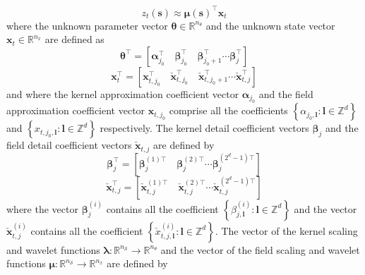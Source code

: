 \documentclass[11pt,draftcls,onecolumn,peerreview]{IEEEtran}
\begin{document}
\begin{equation}
 z_t\left(\mathbf{s}\right)\approx\boldsymbol\mu\left(\mathbf{s}\right)^\top\mathbf{x}_t
\label{eq:FieldFiniteExpansion}
\end{equation}
where the unknown parameter vector $ \boldsymbol\theta \in \mathbb{R}^{n_{\theta}}$ and the unknown state vector $ \mathbf{x}_t \in \mathbb{R}^{n_x}$ are defined as 
\begin{equation}
 \boldsymbol\theta^\top=\left[ \boldsymbol\alpha_{j_0}^\top \quad \boldsymbol\beta_{j_0}^\top \quad \boldsymbol\beta_{j_0+1}^\top \cdots \boldsymbol\beta_{j}^\top\right] 
\label{KernelWeights}
\end{equation}
\begin{equation}
 \mathbf{x}_{t}^\top=\left[\mathbf{x}_{t,j_{0}}^\top \quad  \check{\mathbf{x}}_{t,j_{0}}^\top \quad  \check{\mathbf{x}}_{t,j_{0}+1}^\top \cdots \check{\mathbf{x}}_{t,j}^\top\right] 
\label{FieldWeights}
\end{equation}
and where the kernel approximation coefficient vector $\boldsymbol \alpha_{j_0}$  and the field approximation coefficient vector $\mathbf{x}_{t,j_{0}}$ comprise all the coefficients $\left\lbrace\alpha_{j_0,\mathbf l}:\mathbf{l} \in \mathbb{Z}^d \right\rbrace $ and $\left\lbrace x_{t,j_0,\mathbf l}: \mathbf{l} \in \mathbb{Z}^d\right\rbrace$ respectively. The kernel detail coefficient vectors $\boldsymbol \beta_{j}$ and the field detail coefficient vectors $\check{\mathbf{x}}_{t,j}$ are defined by
\begin{equation}
 \boldsymbol\beta_{j}^\top=\left[\boldsymbol\beta_{j}^{(1)\top} \quad \boldsymbol\beta_{j}^{(2)\top} \cdots \boldsymbol\beta_{j}^{(2^d-1)\top}\right] 
\end{equation}
\begin{equation}
\check{\mathbf{x}}_{t,j}^\top=\left[\check{\mathbf{x}}_{t,j}^{(1)\top} \quad \check{\mathbf{x}}_{t,j}^{(2)\top} \cdots \check{\mathbf{x}}_{t,j}^{(2^d-1)\top}\right] 
\end{equation}
where the vector $\boldsymbol\beta_{j}^{(i)}$ contains all the coefficient $\left\lbrace \beta_{j,\mathbf l}^{(i)} :\mathbf{l} \in \mathbb{Z}^d\right\rbrace$ and the vector $\check{\mathbf{x}}_{t,j}^{(i)}$ contains all the coefficient $\left\lbrace  \check x_{t,j,\mathbf l}^{(i)}:\mathbf{l} \in \mathbb{Z}^d\right\rbrace$. 
 The vector of the kernel scaling and wavelet functions $\boldsymbol\lambda: \mathbb{R}^{n_{\mathcal S}}\rightarrow \mathbb{R}^{n_{\theta}}$ and the vector of the field scaling and wavelet functions $\boldsymbol\mu: \mathbb{R}^{n_{\mathcal S}}\rightarrow \mathbb{R}^{n_x}$ are defined by
\end{document}
